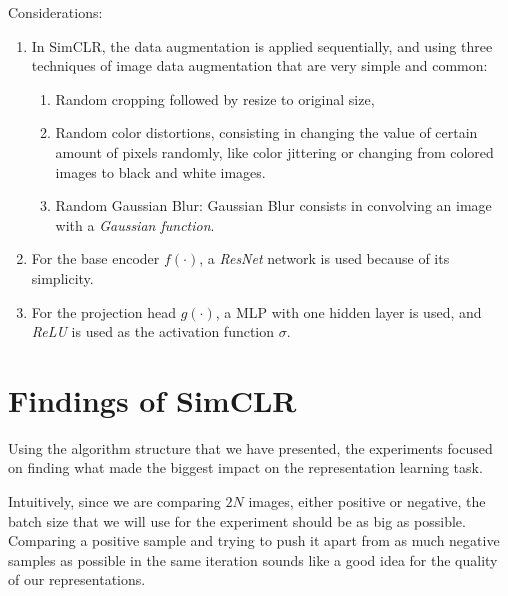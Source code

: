 Considerations:
\begin{enumerate}
\item In SimCLR, the data augmentation is applied sequentially, and using three techniques of image data augmentation that are very simple and common:
\begin{enumerate}
\item Random cropping followed by resize to original size,
\item Random color distortions, consisting in changing the value of certain amount of pixels randomly, like color jittering or changing from colored images to black and white images.
\item Random Gaussian Blur: Gaussian Blur consists in convolving an image with a \emph{Gaussian function}.
\end{enumerate}

\item For the base encoder $f(\cdot)$, a \emph{ResNet} network is used because of its simplicity.
\item For the projection head $g(\cdot)$, a MLP with one hidden layer is used, and \emph{ReLU} is used as the activation function $\sigma$.
\end{enumerate}



\section{Findings of SimCLR}

    Using the algorithm structure that we have presented, the experiments focused on finding what made the biggest impact on the representation learning task. 
    
    Intuitively, since we are comparing $2N$ images, either positive or negative, the batch size that we will use for the experiment should be as big as possible. Comparing a positive sample and trying to push it apart from as much negative samples as possible in the same iteration sounds like a good idea for the quality of our representations.
    
